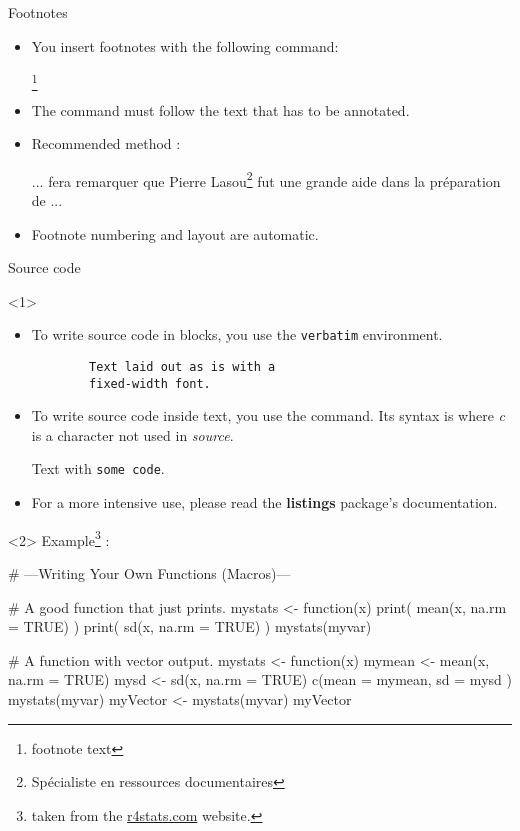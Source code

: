 \begin{frame}[fragile,c]{Footnotes}
	\begin{itemize}
		\item You insert footnotes with the following command:
\begin{codesource}
	\footnote{footnote text}
\end{codesource}
		\item The command must follow the text that has to be annotated.
		\item Recommended method :
\begin{codesource}
	... fera remarquer que Pierre Lasou\footnote{%
		Spécialiste en ressources documentaires} %
	fut une grande aide dans la préparation de ...
\end{codesource}
		\item Footnote numbering and layout are automatic.
	\end{itemize}
\end{frame}

\begin{frame}[fragile,c]{Source code}
	\begin{onlyenv}
		\begin{itemize}
			\item To write source code in blocks, you use the \texttt{verbatim} environment.
\begin{codesource}
	\begin{verbatim}
		Text laid out as is with a
		fixed-width font.
	\end{verbatim}
\end{codesource}
			\item To write source code inside text, you use the  command. Its syntax
			is  where \emph{c} is a character not used in \emph{source}.
\begin{codesource}
	Text with \verb|some code|.
\end{codesource}
			\item For a more intensive use, please read the \textbf{listings} package's documentation.
		\end{itemize}
	\end{onlyenv}

\begin{onlyenv}<2>
	Example\footnote{taken from the \href{http://r4stats.com/examples/programming/}{r4stats.com} website.} :
\begin{codesource}
# ---Writing Your Own Functions (Macros)---

# A good function that just prints.
mystats <- function(x) {
	print( mean(x, na.rm = TRUE) )
	print(   sd(x, na.rm = TRUE) )
}
mystats(myvar)

# A function with vector output.
mystats  <- function(x) {
	mymean <- mean(x, na.rm = TRUE)
	mysd   <-   sd(x, na.rm = TRUE)
	c(mean = mymean, sd = mysd )
}
mystats(myvar)
myVector <- mystats(myvar)
myVector
\end{codesource}
\end{onlyenv}
\end{frame}
